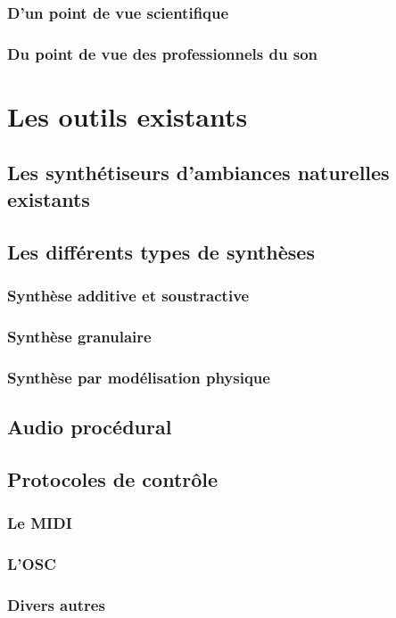 \documentclass[12pt,a4paper]{report}
\begin{document}
\subsection{D'un point de vue scientifique}
\subsection{Du point de vue des professionnels du son}
\chapter{Les outils existants}
\section{Les synthétiseurs d’ambiances naturelles existants}
\section{Les différents types de synthèses}
\subsection{Synthèse additive et soustractive}
\subsection{Synthèse granulaire}
\subsection{Synthèse par modélisation physique}
\section{Audio procédural}
\section{Protocoles de contrôle}
\subsection{Le MIDI}
\subsection{L’OSC}
\subsection{Divers autres}
\end{document}
